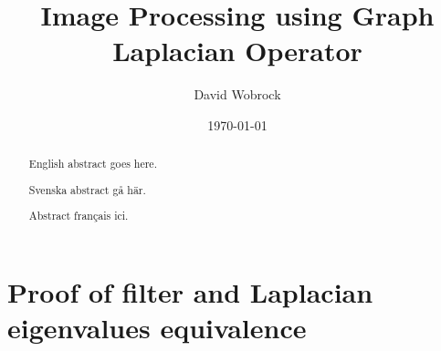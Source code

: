 \documentclass[]{kththesis}
\title{Image Processing using Graph Laplacian Operator}
\author{David Wobrock}
\date{\today}
\begin{document}
\frontmatter %

\titlepage

\begin{abstract}
  English abstract goes here.
\end{abstract}

\begin{otherlanguage}{swedish}
  \begin{abstract}
   Svenska abstract gå här.
  \end{abstract}
\end{otherlanguage}

\begin{otherlanguage}{french}
  \begin{abstract}
   Abstract français ici.
  \end{abstract}
\end{otherlanguage}

\tableofcontents

\mainmatter %







\clearpage
\printbibliography

\appendix %

\chapter{Proof of filter and Laplacian eigenvalues equivalence}
\label{appendix:eigenvalue_proof}

\end{document}
